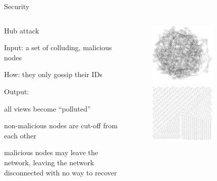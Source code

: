 \begin{frame}{Security}

\begin{columns}
\begin{column}{0.55\textwidth}
\begin{block}{Hub attack}
\BIL
\item Input: a set of colluding, malicious nodes 
\item How: they only gossip their IDs
\item Output: 
\BI
\item all views become “polluted”
\item non-malicious nodes are cut-off from each other
\item malicious nodes may leave the network, leaving the network disconnected with no way to recover
\EI
\EIL
\end{block}
\end{column}
\begin{column}{0.45\textwidth}
\begin{figure}
\includegraphics[width=0.7\textwidth]{hub1}\\
\includegraphics[width=0.7\textwidth]{hub2}	
\end{figure}
\end{column}
\end{columns}

\end{frame}

